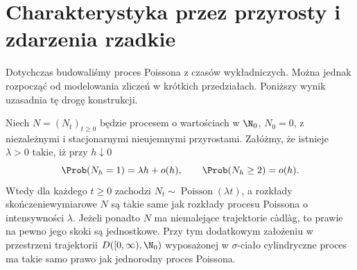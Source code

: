\section{Charakterystyka przez przyrosty i zdarzenia rzadkie}
Dotychczas budowaliśmy proces Poissona z czasów wykładniczych.
Można jednak rozpocząć od modelowania zliczeń w krótkich
przedziałach. Poniższy wynik uzasadnia tę drogę konstrukcji.

\begin{twierdzenie}
\label{thm:poisson-infinitesimal}
Niech $N=(N_t)_{t\ge0}$ będzie procesem o wartościach
w $\N_0$, $N_0=0$, z niezależnymi i stacjonarnymi
nieujemnymi przyrostami. Załóżmy, że istnieje $\lambda>0$
takie, iż przy $h\downarrow0$
\[
\Prob(N_h=1)=\lambda h+o(h),\qquad
\Prob(N_h\ge2)=o(h).
\]
Wtedy dla każdego $t\ge0$ zachodzi
$N_t\sim\operatorname{Poisson}(\lambda t)$,
a rozkłady skończeniewymiarowe $N$ są takie same jak
rozkłady procesu Poissona o intensywności $\lambda$.
Jeżeli ponadto $N$ ma niemalejące trajektorie c\`adl\`ag,
to prawie na pewno jego skoki są jednostkowe.
Przy tym dodatkowym założeniu w przestrzeni trajektorii
$D([0,\infty),\N_0)$ wyposażonej w $\sigma$-ciało
cylindryczne proces ma takie samo prawo jak
jednorodny proces Poissona.
\end{twierdzenie}
